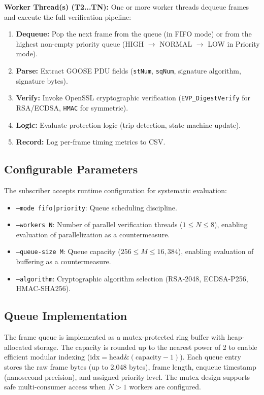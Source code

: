 \documentclass[journal]{IEEEtran}
\begin{document}
\textbf{Worker Thread(s) (T2...TN):} One or more worker threads dequeue frames and execute the full verification pipeline:
\begin{enumerate}[leftmargin=*]
    \item \textbf{Dequeue:} Pop the next frame from the queue (in FIFO mode) or from the highest non-empty priority queue (HIGH $\rightarrow$ NORMAL $\rightarrow$ LOW in Priority mode).
    \item \textbf{Parse:} Extract GOOSE PDU fields (\texttt{stNum}, \texttt{sqNum}, signature algorithm, signature bytes).
    \item \textbf{Verify:} Invoke OpenSSL cryptographic verification (\texttt{EVP\_DigestVerify} for RSA/ECDSA, \texttt{HMAC} for symmetric).
    \item \textbf{Logic:} Evaluate protection logic (trip detection, state machine update).
    \item \textbf{Record:} Log per-frame timing metrics to CSV.
\end{enumerate}

\subsection{Configurable Parameters}
The subscriber accepts runtime configuration for systematic evaluation:
\begin{itemize}[leftmargin=*]
    \item \texttt{--mode fifo|priority}: Queue scheduling discipline.
    \item \texttt{--workers N}: Number of parallel verification threads ($1 \leq N \leq 8$), enabling evaluation of parallelization as a countermeasure.
    \item \texttt{--queue-size M}: Queue capacity ($256 \leq M \leq 16{,}384$), enabling evaluation of buffering as a countermeasure.
    \item \texttt{--algorithm}: Cryptographic algorithm selection (RSA-2048, ECDSA-P256, HMAC-SHA256).
\end{itemize}

\subsection{Queue Implementation}
The frame queue is implemented as a mutex-protected ring buffer with heap-allocated storage. The capacity is rounded up to the nearest power of 2 to enable efficient modular indexing ($\text{idx} = \text{head} \mathbin{\&} (\text{capacity} - 1)$). Each queue entry stores the raw frame bytes (up to 2,048 bytes), frame length, enqueue timestamp (nanosecond precision), and assigned priority level. The mutex design supports safe multi-consumer access when $N > 1$ workers are configured.
\end{document}
